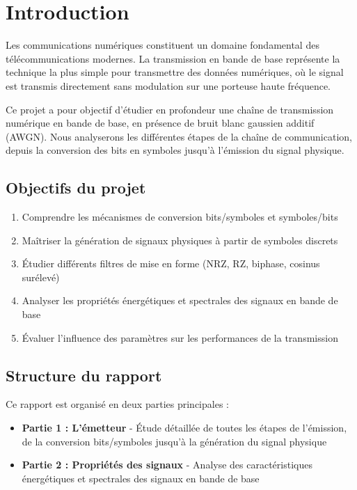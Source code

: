 \documentclass[12pt,a4paper]{article}
\begin{document}
\tableofcontents
\newpage

\section*{Introduction}

Les communications numériques constituent un domaine fondamental des télécommunications modernes. La transmission en bande de base représente la technique la plus simple pour transmettre des données numériques, où le signal est transmis directement sans modulation sur une porteuse haute fréquence.

Ce projet a pour objectif d'étudier en profondeur une chaîne de transmission numérique en bande de base, en présence de bruit blanc gaussien additif (AWGN). Nous analyserons les différentes étapes de la chaîne de communication, depuis la conversion des bits en symboles jusqu'à l'émission du signal physique.

\subsection*{Objectifs du projet}

\begin{enumerate}
    \item Comprendre les mécanismes de conversion bits/symboles et symboles/bits
    \item Maîtriser la génération de signaux physiques à partir de symboles discrets
    \item Étudier différents filtres de mise en forme (NRZ, RZ, biphase, cosinus surélevé)
    \item Analyser les propriétés énergétiques et spectrales des signaux en bande de base
    \item Évaluer l'influence des paramètres sur les performances de la transmission
\end{enumerate}

\subsection*{Structure du rapport}

Ce rapport est organisé en deux parties principales :

\begin{itemize}
    \item \textbf{Partie 1 : L'émetteur} - Étude détaillée de toutes les étapes de l'émission, de la conversion bits/symboles jusqu'à la génération du signal physique
    \item \textbf{Partie 2 : Propriétés des signaux} - Analyse des caractéristiques énergétiques et spectrales des signaux en bande de base
\end{itemize}
\end{document}
